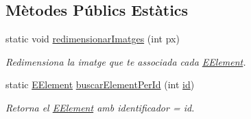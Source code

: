 \subsection*{Mètodes Públics Estàtics}
\begin{DoxyCompactItemize}
\item 
static void \hyperlink{enumlogica_1_1enumeracions_1_1_e_element_a463fe7d8bef930e62019d223bc2f0ed6}{redimensionar\+Imatges} (int px)
\begin{DoxyCompactList}\small\item\em Redimensiona la imatge que te associada cada \hyperlink{enumlogica_1_1enumeracions_1_1_e_element}{E\+Element}. \end{DoxyCompactList}\item 
static \hyperlink{enumlogica_1_1enumeracions_1_1_e_element}{E\+Element} \hyperlink{enumlogica_1_1enumeracions_1_1_e_element_a5bd957c7a226b8127a5ef222f7d5a869}{buscar\+Element\+Per\+Id} (int \hyperlink{enumlogica_1_1enumeracions_1_1_e_element_a276fc494132bca06ef0e2e8490888a01}{id})
\begin{DoxyCompactList}\small\item\em Retorna el \hyperlink{enumlogica_1_1enumeracions_1_1_e_element}{E\+Element} amb identificador = id. \end{DoxyCompactList}\end{DoxyCompactItemize}

